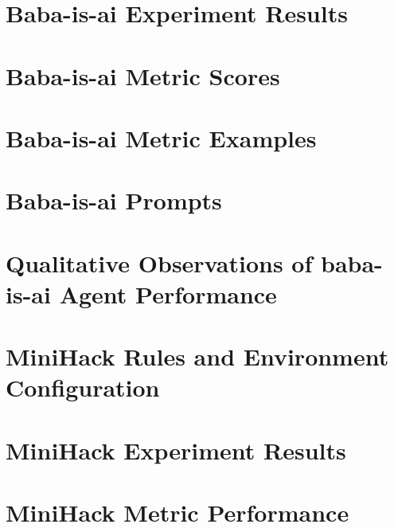 \documentclass[../main.tex]{subfiles}
\begin{document}
    \section{Baba-is-ai Experiment Results}
    \label{appendix:heldout}
    

    \section{Baba-is-ai Metric Scores}
    \label{appendix:babaisai}
    
    \newpage

    \section{Baba-is-ai Metric Examples}
    \label{appendix:babaisai_metrics}
    
    \newpage

    \section{Baba-is-ai Prompts}
    \label{appendix:babaisai_prompts}
    
    \newpage

    \section{Qualitative Observations of baba-is-ai Agent Performance}
    \label{appendix:baba_is_ai_obs}
    
    \newpage

    \section{MiniHack Rules and Environment Configuration}
    \label{appendix:minihack_rules}
    

    \section{MiniHack Experiment Results}
    \label{appendix:heldout_mini}
    

    \section{MiniHack Metric Performance}
    \label{appendix:minihack}
    
    \newpage
\end{document}
